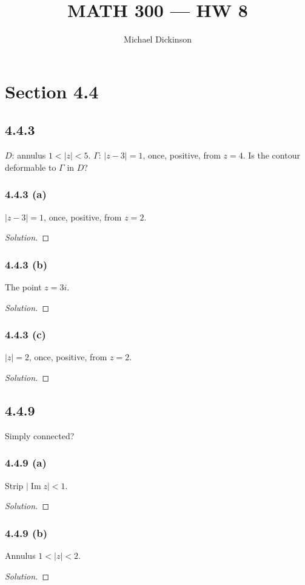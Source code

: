 \documentclass{article}
\title{MATH 300 --- HW 8}
\author{Michael Dickinson}
\date{}
\newenvironment{solution}{
\begin{proof}[Solution]}{
\end{proof}}
\begin{document}
\maketitle

\section*{Section 4.4}

\subsection*{4.4.3}
$D$: annulus $1<|z|<5$. $\Gamma$: $|z-3|=1$, once, positive, from $z=4$.
Is the contour deformable to $\Gamma$ in $D$?

\subsubsection*{4.4.3 (a)}
$|z-3|=1$, once, positive, from $z=2$.
\begin{solution}
\end{solution}

\subsubsection*{4.4.3 (b)}
The point $z=3i$.
\begin{solution}
\end{solution}

\subsubsection*{4.4.3 (c)}
$|z|=2$, once, positive, from $z=2$.
\begin{solution}
\end{solution}

\subsection*{4.4.9}
Simply connected?

\subsubsection*{4.4.9 (a)}
Strip $|\operatorname{Im} z|<1$.
\begin{solution}
\end{solution}

\subsubsection*{4.4.9 (b)}
Annulus $1<|z|<2$.
\begin{solution}
\end{solution}
\end{document}
